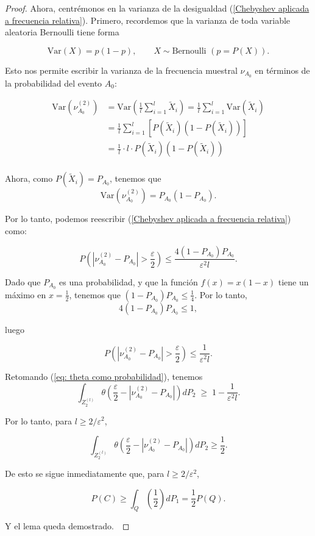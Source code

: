 \documentclass{report}
\begin{document}
\begin{proof}
Ahora, centrémonos en la varianza de la desigualdad (\ref{Chebyshev aplicada a frecuencia relativa}). Primero,
recordemos que la varianza de toda variable aleatoria Bernoulli tiene forma

\[
     \text{Var}(X) = p(1-p), \qquad X \sim \text{Bernoulli } (p=P(X)).
\]
\bigskip

Esto nos permite escribir la varianza de la frecuencia muestral $\nu_{A_0}$ en términos de la probabilidad del evento $A_0$:

\[
\begin{aligned}
    \text{Var}\left(\nu_{A_0}^{(2)}\right) &=\text{Var}\left(\frac{1}{l}\sum_{i=1}^l \tilde{X}_i\right)
    = \frac{1}{l}\sum_{i=1}^l \text{Var}\left(\tilde{X}_i\right)\\
    &= \frac{1}{l}\sum_{i=1}^l \left[P(\tilde{X}_i)(1-P(\tilde{X}_i))\right]\\
    &=\frac{1}{l} \cdot l\cdot P(\tilde{X}_i)(1-P(\tilde{X}_i)) \\
\end{aligned}
\]

Ahora, como $P(\tilde{X}_i) = P_{A_0}$, tenemos que 
\[
    \text{Var}\left(\nu_{A_0}^{(2)}\right) = P_{A_0}(1-P_{A_0}).
\]

Por lo tanto, podemos reescribir (\ref{Chebyshev aplicada a frecuencia relativa}) como:

\[
P\left( \left| \nu^{(2)}_{A_0} - P_{A_0} \right| > \frac{\varepsilon}{2} \right) 
\leq \frac{4(1 - P_{A_0}) P_{A_0}}{\varepsilon^2 l}.
\]\newline

Dado que $P_{A_0}$ es una probabilidad, y que la función $f(x)=x(1-x)$ tiene un máximo en $x=\frac{1}{2}$, tenemos que
$(1 - P_{A_0}) P_{A_0} \leq \frac{1}{4}$. Por lo tanto,
\[4(1 - P_{A_0}) P_{A_0} \leq 1, 
\]

luego

\[
P\left( \left| \nu^{(2)}_{A_0} - P_{A_0} \right| > \frac{\varepsilon}{2} \right) \leq \frac{1}{\varepsilon^2 l}.
\]\newline

Retomando (\ref{eq: theta como probabilidad}), tenemos 
\[
    \int_{ Z_2^{(l)}}  \theta\left(\frac{\varepsilon}{2} - |\nu^{(2)}_{A_0}-P_{A_0}|\right) dP_2 \;\geq\; 1 - \frac{1}{\varepsilon^2 l}.
    \]

Por lo tanto, para \( l \geq 2 / \varepsilon^2 \),

\[
\int_{Z_2^{(l)}} \theta \left( \frac{\varepsilon}{2} - \left| \nu^{(2)}_{A_0} - P_{A_0} \right| \right) dP_2 \geq \frac{1}{2}.
\]

De esto se sigue inmediatamente que, para \( l \geq 2 / \varepsilon^2 \),

\[
P(C) \geq \int_{Q} \left( \frac{1}{2} \right) dP_1  =
 \frac{1}{2} P(Q).
\]

Y el lema queda demostrado.\



\end{proof}
\end{document}
